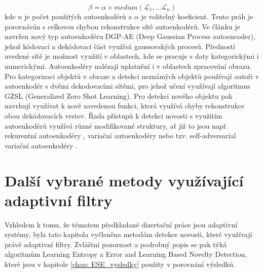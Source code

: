 \begin{equation}
\beta = \alpha \times median(\mathcal{L}_1,\dots \mathcal{L}_n)
\end{equation}
kde $n$ je počet použitých autoenkodérů a $\alpha$ je volitelný koeficient.  Tento práh je porovnáván s celkovou chybou rekonstrukce sítě autoenkodérů.
Ve článku \cite{auto5} je navržen nový typ autoenkodéru DGP-AE (Deep Gaussian Process autoencoder), jehož kódovací a dekódovací část využívá gaussovských procesů. Předností uvedené sítě je možnost využití v oblastech, kde se pracuje s daty kategorickými i numerickými. Autoenkodéry nalézají uplatnění i v oblastech zpracování obrazu. Pro kategorizaci objektů v obraze a detekci neznámých objektů používají autoři v \cite{auto6} autoenkodér s dvěmi dekodovacími sítěmi, pro jehož učení využívají algoritmus GZSL (Generalized Zero Shot Learning). Pro detekci nového objektu pak navrhují využívat k nově zavedenou funkci, která využívá chyby rekonstrukce obou dekódovacích vrstev. Řada přístupů k detekci novosti s využitím autoenkodérů využívá různé modifikované struktury, ať již to jsou např. rekurentní autoenkodéry \cite{auto7,auto8}, variační autoenkodéry \cite{auto9} nebo tzv. self-adversarial variační autoenkodéry \cite{auto10}.


\section{Další vybrané metody využívající adaptivní filtry}
Vzhledem k tomu, že tématem předkladané dizertační práce jsou adaptivní systémy, byla tato kapitola vyčleněna metodám detekce novosti, které využívají právě adaptivní filtry. Zvláštní pozornost a podrobný popis se pak týká algoritmům Learning Entropy a Error and Learning Based Novelty Detection, které jsou v kapitole \ref{chap: ESE_vysledky} použity v porovnání výsledků.
